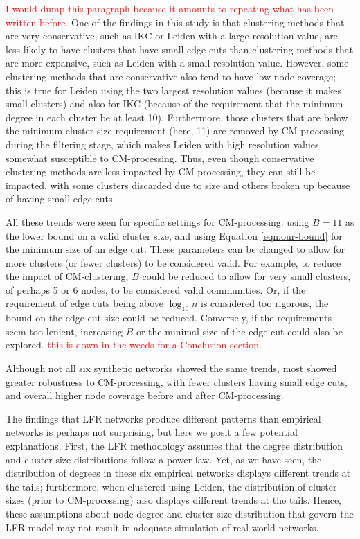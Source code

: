 \documentclass[11pt]{article}   	%
\begin{document}
\textcolor{red}{I would dump this paragraph because it amounts to repeating what has been written before.} One of the findings in this study is that clustering methods that are very conservative, such as  IKC or Leiden with a large resolution value, are less likely to have clusters that have small edge cuts than clustering methods that are more expansive, such as Leiden with a small resolution value. However, some clustering methods that are conservative also tend to have low node coverage; this is true for  Leiden using the two largest resolution values (because it makes small clusters) and also for IKC (because of the requirement that the minimum degree in each cluster be at least 10).  Furthermore, those  clusters that are below the minimum cluster size requirement (here, 11) are removed by CM-processing during the filtering stage, which makes Leiden with high resolution values somewhat susceptible to CM-processing.  Thus, even though conservative clustering methods are less impacted by CM-processing, they can still be impacted, with some clusters discarded due to size and others broken up because of having small edge cuts.

All these trends were seen for specific settings for CM-processing: using $B=11$ as the lower bound on a valid cluster size, and using Equation \ref{eqn:our-bound} for the minimum size of an edge cut.
These parameters can be changed to allow for more clusters (or fewer clusters) to be considered valid.
For example, to reduce the impact of CM-clustering,  $B$ could be reduced to allow for very small clusters, of perhaps 5 or 6 nodes, to be considered valid communities. 
Or, if the requirement of edge cuts being above $\log_{10}n$ is considered too rigorous, the bound on the edge cut size could be reduced.  
Conversely, if the requirements seem too lenient,  increasing $B$ or the minimal size of the edge cut could also be explored. \textcolor{red}{this is down in the weeds for a Conclusion section}.
 
Although not all six synthetic networks showed the same trends, most showed greater robustness to CM-processing, with fewer clusters having small edge cuts, and overall higher node coverage before and after CM-processing.

The findings that LFR networks produce different patterns than empirical networks is perhaps not surprising, but here we posit a few potential explanations.
First, the LFR methodology assumes that the degree distribution and cluster size distributions follow a power law.
Yet, as we have seen, the distribution of degrees in these six empirical networks displays different trends at the tails; furthermore, when clustered using Leiden, the distribution of cluster sizes (prior to CM-processing) also displays different trends at the tails. Hence, these assumptions about node degree and cluster size distribution that govern the LFR model may not  result in adequate simulation of real-world networks.
\end{document}
